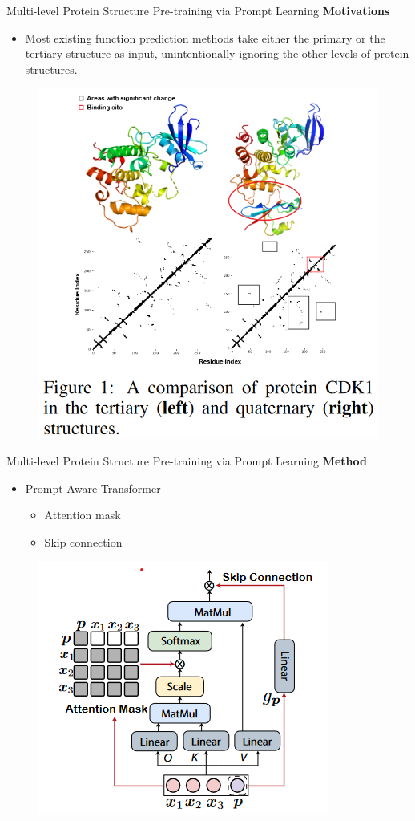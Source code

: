 \documentclass[notheorems, aspectratio=54]{beamer}
\begin{document}
\begin{frame}{Multi-level Protein Structure Pre-training via Prompt Learning}
  \textbf{Motivations}
  \begin{itemize}
      \item Most existing function prediction methods take either the primary or the tertiary structure as input, unintentionally ignoring the other levels of protein structures.
  \end{itemize}

  \begin{figure}[!h]
    \centering
    \includegraphics[width=0.4\linewidth]{figures/MPH-fig1.png}
  \end{figure}
\end{frame}


\begin{frame}{Multi-level Protein Structure Pre-training via Prompt Learning}
  \textbf{Method}
  \begin{itemize}
      \item Prompt-Aware Transformer
      \begin{itemize}
        \item Attention mask
        \item Skip connection
      \end{itemize}
  \end{itemize}

  \begin{figure}[!h]
    \centering
    \includegraphics[width=0.5\linewidth]{figures/MPH-fig3.png}
  \end{figure}
\end{frame}
\end{document}
